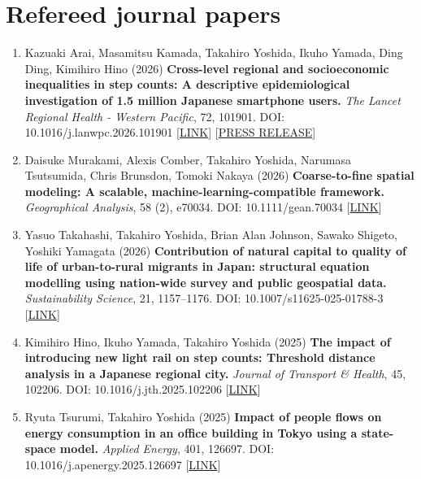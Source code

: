 \documentclass[
]{book}
\providecommand{\tightlist}{%
  \setlength{\itemsep}{0pt}\setlength{\parskip}{0pt}}
\begin{document}
\section*{Refereed journal papers}\label{refereed-journal-papers}

\begin{enumerate}
\def\labelenumi{\arabic{enumi}.}
\tightlist
\item
  Kazuaki Arai, Masamitsu Kamada, Takahiro Yoshida, Ikuho Yamada, Ding Ding, Kimihiro Hino (2026)
  \textbf{Cross-level regional and socioeconomic inequalities in step counts: A descriptive epidemiological investigation of 1.5 million Japanese smartphone users.}
  \emph{The Lancet Regional Health - Western Pacific}, 72, 101901.
  DOI: 10.1016/j.lanwpc.2026.101901 {[}\href{https://www.sciencedirect.com/science/article/pii/S2666606526001057}{LINK}{]} {[}\href{https://www.t.u-tokyo.ac.jp/hubfs/press-release/2026/0620/001/text.pdf}{PRESS RELEASE}{]}
\item
  Daisuke Murakami, Alexis Comber, Takahiro Yoshida, Narumasa Tsutsumida, Chris Brunsdon, Tomoki Nakaya (2026)
  \textbf{Coarse-to-fine spatial modeling: A scalable, machine-learning-compatible framework.}
  \emph{Geographical Analysis}, 58 (2), e70034.
  DOI: 10.1111/gean.70034 {[}\href{https://onlinelibrary.wiley.com/doi/10.1111/gean.70034}{LINK}{]}
\item
  Yasuo Takahashi, Takahiro Yoshida, Brian Alan Johnson, Sawako Shigeto, Yoshiki Yamagata (2026)
  \textbf{Contribution of natural capital to quality of life of urban-to-rural migrants in Japan: structural equation modelling using nation-wide survey and public geospatial data.}
  \emph{Sustainability Science}, 21, 1157--1176.
  DOI: 10.1007/s11625-025-01788-3 {[}\href{https://doi.org/10.1007/s11625-025-01788-3}{LINK}{]}
\item
  Kimihiro Hino, Ikuho Yamada, Takahiro Yoshida (2025)
  \textbf{The impact of introducing new light rail on step counts: Threshold distance analysis in a Japanese regional city.}
  \emph{Journal of Transport \& Health}, 45, 102206.
  DOI: 10.1016/j.jth.2025.102206 {[}\href{https://doi.org/10.1016/j.jth.2025.102206}{LINK}{]}
\item
  Ryuta Tsurumi, Takahiro Yoshida (2025)
  \textbf{Impact of people flows on energy consumption in an office building in Tokyo using a state-space model.}
  \emph{Applied Energy}, 401, 126697.
  DOI: 10.1016/j.apenergy.2025.126697 {[}\href{https://doi.org/10.1016/j.apenergy.2025.126697}{LINK}{]}

\end{enumerate}
\end{document}
